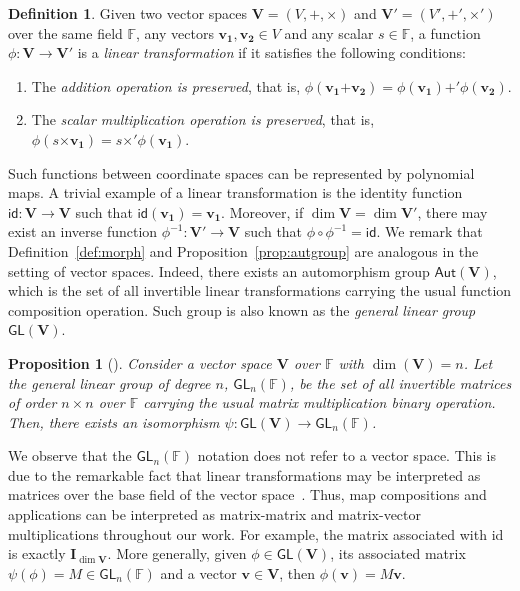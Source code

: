 \documentclass[12pt, a4paper, oneside]{memoir}
\newtheorem{proposition}[theorem]{Proposition}
\theoremstyle{definition}
\newtheorem{definition}[theorem]{Definition}
\begin{document}
\begin{definition}
  Given two vector spaces $\mathbf{V} = (V, \bm{+}, \bm{\times})$ and $\mathbf{V'} = (V', \bm{+'}, \bm{\times'})$ over the same field $\mathbb{F}$, any vectors $\mathbf{v_{1}}, \mathbf{v_{2}} \in V$ and any scalar $s \in \mathbb{F}$, a function $\phi : \mathbf{V} \to \mathbf{V'}$ is a \emph{linear transformation} if it satisfies the following conditions:
  
  \begin{enumerate}
    \item The \emph{addition operation is preserved}, that is, $\phi(\mathbf{v_{1}} \bm{+} \mathbf{v_{2}}) = \phi(\mathbf{v_{1}}) \bm{+'} \phi(\mathbf{v_{2}})$.
    \item The \emph{scalar multiplication operation is preserved}, that is, $\phi(s \bm{\times} \mathbf{v_{1}}) = s \bm{\times'} \phi(\mathbf{v_{1}})$.
  \end{enumerate} 
\end{definition}

Such functions between coordinate spaces can be represented by polynomial maps. A trivial example of a linear transformation is the identity function $\mathsf{id} : \mathbf{V} \to \mathbf{V}$ such that $\mathsf{id}(\mathbf{v_{1}}) = \mathbf{v_{1}}$. Moreover, if $\dim \mathbf{V} = \dim \mathbf{V'}$, there may exist an inverse function $\phi^{-1} : \mathbf{V'} \to \mathbf{V}$ such that $\phi \circ \phi^{-1} = \mathsf{id}$. We remark that Definition~\ref{def:morph} and Proposition~\ref{prop:autgroup} are analogous in the setting of vector spaces. Indeed, there exists an automorphism group $\mathsf{Aut}(\mathbf{V})$, which is the set of all invertible linear transformations carrying the usual function composition operation. Such group is also known as the \emph{general linear group} $\mathsf{GL}(\mathbf{V})$.

\begin{proposition}[{\cite[p.~418, Cor.~14]{Dummit:2003}}]
  Consider a vector space $\mathbf{V}$ over $\mathbb{F}$ with $\dim(\mathbf{V}) = n$. Let the \emph{general linear group of degree $n$, $\mathsf{GL}_{n}(\mathbb{F})$}, be the set of all invertible matrices of order $n \times n$ over $\mathbb{F}$ carrying the usual matrix multiplication binary operation. Then, there exists an isomorphism $\psi : \mathsf{GL}(\mathbf{V}) \to \mathsf{GL}_{n}(\mathbb{F})$.
\end{proposition}

We observe that the $\mathsf{GL}_{n}(\mathbb{F})$ notation does not refer to a vector space. This is due to the remarkable fact that linear transformations may be interpreted as matrices over the base field of the vector space~\cite[Section 11.2]{Dummit:2003}. Thus, map compositions and applications can be interpreted as matrix-matrix and matrix-vector multiplications throughout our work. For example, the matrix associated with \textsf{id} is exactly $\mathbf{I}_{\dim \mathbf{V}}$. More generally, given $\phi \in \mathsf{GL}(\mathbf{V})$, its associated matrix $\psi(\phi) = M \in \mathsf{GL}_{n}(\mathbb{F})$ and a vector $\mathbf{v} \in \mathbf{V}$, then $\phi(\mathbf{v}) = M\mathbf{v}$.
\end{document}
